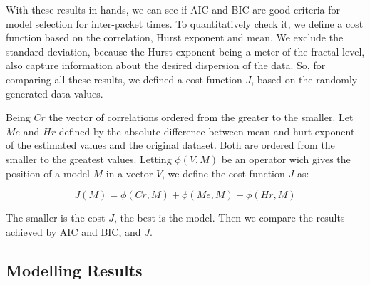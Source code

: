 With these results in hands, we can see if AIC and BIC are good criteria for model selection for inter-packet times. To quantitatively check it, we define a cost function based on the correlation, Hurst exponent and mean. We exclude the standard deviation, because the Hurst exponent being a meter of the fractal level, also capture information about the desired dispersion of the data. So, for comparing all these results, we defined a cost function $J$, based on the randomly generated data values.

Being $Cr$ the vector of correlations ordered from the greater to the smaller. Let $Me$ and $Hr$ defined by the absolute difference between mean and hurt exponent of the estimated values and the original dataset. Both are ordered from the smaller to the greatest values. Letting $\phi(V, M)$ be an operator wich gives the position of a model $M$ in a vector $V$, we define the cost function $J$ as:


\begin{equation}
J(M) = \phi(Cr, M) + \phi(Me, M) + \phi(Hr, M)
\end{equation}

The smaller is the cost $J$, the best is the model. Then we compare the results achieved by AIC and BIC, and $J$.

\subsection{Modelling Results}


